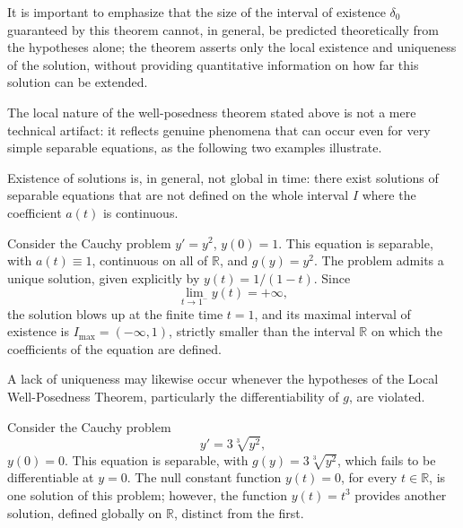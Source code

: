 \begin{remark}
It is important to emphasize that the size of the interval of existence $\delta_0$ guaranteed by this theorem cannot, in general, be predicted theoretically from the hypotheses alone; the theorem asserts only the local existence and uniqueness of the solution, without providing quantitative information on how far this solution can be extended.
\end{remark}

The local nature of the well-posedness theorem stated above is not a mere technical artifact: it reflects genuine phenomena that can occur even for very simple separable equations, as the following two examples illustrate.

\begin{remark}
Existence of solutions is, in general, not global in time: there exist solutions of separable equations that are not defined on the whole interval $I$ where the coefficient $a(t)$ is continuous.
\end{remark}

\begin{example}
Consider the Cauchy problem $y' = y^2$, $y(0) = 1$. This equation is separable, with $a(t) \equiv 1$, continuous on all of $\mathbb{R}$, and $g(y) = y^2$. The problem admits a unique solution, given explicitly by $y(t) = 1/(1-t)$. Since \[
\lim_{t \to 1^-} y(t) = +\infty,
\] the solution blows up at the finite time $t=1$, and its maximal interval of existence is $I_{\max} = (-\infty, 1)$, strictly smaller than the interval $\mathbb{R}$ on which the coefficients of the equation are defined.
\end{example}

\begin{remark}
A lack of uniqueness may likewise occur whenever the hypotheses of the Local Well-Posedness Theorem, particularly the differentiability of $g$, are violated.
\end{remark}

\begin{example}
Consider the Cauchy problem
\[
y' = 3\sqrt[3]{y^2},
\]
$y(0) = 0$. This equation is separable, with $g(y) = 3\sqrt[3]{y^2}$, which fails to be differentiable at $y = 0$. The null constant function $y(t) = 0$, for every $t \in \mathbb{R}$, is one solution of this problem; however, the function $y(t) = t^3$ provides another solution, defined globally on $\mathbb{R}$, distinct from the first.
\end{example}

